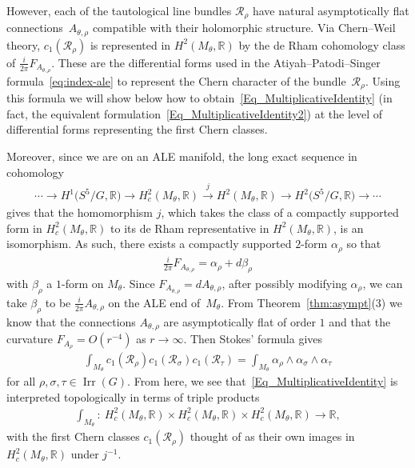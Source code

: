 \documentclass[10pt,a4paper]{amsart}
\numberwithin{equation}{section}
\newcommand{\cR}{\mathcal{R}}
\newcommand{\R}{{\mathbb R}}
\newcommand{\Irr}{\operatorname{Irr}}
\begin{document}
However, each of the tautological line bundles $\cR_{\rho}$
have natural asymptotically f\/lat connec\-tions~$A_{\theta, \rho}$
compatible with their holomorphic structure. Via Chern--Weil theory,
$c_1(\cR_{\rho})$ is represented in $H^2(M_{\theta},\R)$ by the de
Rham cohomology class of $ \frac{i}{2\pi}F_{A_{\theta,\rho}}$. These
are the dif\/ferential forms used in the Atiyah--Patodi--Singer
formula~\eqref{eq:index-ale} to represent the Chern character of the
bundle~$\cR_{\rho}$.  Using this formula we will show below how to
obtain~\eqref{Eq_MultiplicativeIdentity} (in fact, the equivalent formulation~\eqref{Eq_MultiplicativeIdentity2}) at the level of dif\/ferential forms
representing the f\/irst Chern classes.

Moreover, since we are on an ALE manifold, the long exact sequence in
cohomology
\begin{gather*}
  \cdots \to H^1\big(S^5/G,\R\big) \to H^2_{c}(M_{\theta},\R) \stackrel{j}\to
  H^2(M_{\theta},\R) \to H^2\big(S^5/G,\R\big) \to \cdots
\end{gather*}
gives that the homomorphism $j$, which takes the class of a compactly
supported form in $H^2_c(M_{\theta},\R)$ to its de Rham
representative in $H^2(M_{\theta},\R)$, is an isomorphism. As such,
there exists a compactly supported $2$-form $\alpha_{\rho}$ so that
\begin{gather*}
  \tfrac{i}{2\pi}F_{A_{\theta,\rho}} = \alpha_{\rho} + d\beta_{\rho}
\end{gather*}
with $\beta_{\rho}$ a $1$-form on $M_{\theta}$. Since
$F_{A_{\theta,\rho}} = dA_{\theta, \rho}$, after possibly modifying
$\alpha_{\rho}$, we can take $\beta_{\rho}$ to be $\frac{i}{2\pi}
A_{\theta, \rho}$ on the ALE end of~$M_{\theta}$. From
Theorem~\ref{thm:asympt}(3) we know that the
connections $A_{\theta,\rho}$ are asymptotically f\/lat of order $1$ and
that the curvature $F_{A_{\rho}} = O(r^{-4})$ as $r\to \infty$. Then
Stokes' formula gives
\begin{gather*}
  \int_{M_{\theta}} c_1(\cR_{\rho}) c_1(\cR_{\sigma}) c_1 (\cR_{\tau})
  = \int_{M_{\theta}} \alpha_{\rho} \wedge \alpha_{\sigma} \wedge
  \alpha_{\tau}
\end{gather*}
for all $\rho, \sigma, \tau \in \Irr(G)$.  From here, we see
that~\eqref{Eq_MultiplicativeIdentity} is interpreted topologically in terms of
triple products
\begin{gather*}
  \int_{M_\theta}\colon \ H^2_c(M_{\theta},\R) \times H^2_c(M_{\theta},\R) \times H^2_c(M_{\theta},\R) \to \R,
\end{gather*}
with the f\/irst Chern classes $c_1(\cR_{\rho})$ thought of as their own
images in $H^2_c(M_{\theta},\R)$ under $j^{-1}$.
\end{document}
